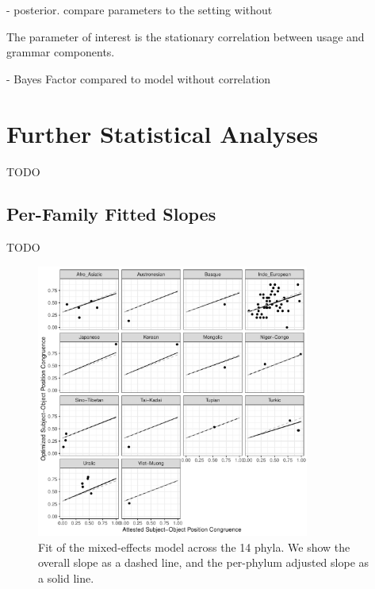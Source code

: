 \documentclass[11pt,a4paper]{article}
\begin{document}
- posterior. compare parameters to the setting without

The parameter of interest is the stationary correlation between usage and grammar components.

- Bayes Factor compared to model without correlation

\section{Further Statistical Analyses}
TODO

\subsection{Per-Family Fitted Slopes}
TODO


\begin{figure}
    \centering
            \includegraphics[width=0.8\textwidth]{../analysis/figures-scratch/byPhylum_all_slopes.pdf}
    \caption{Fit of the mixed-effects model across the 14 phyla. We show the overall slope as a dashed line, and the per-phylum adjusted slope as a solid line.}
    \label{fig:my_label}
\end{figure}
\end{document}

